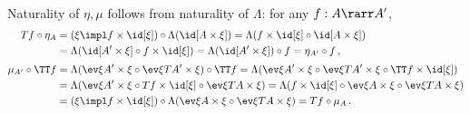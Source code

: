 \documentclass[12pt]{article}
\begin{document}
\begin{itemize}
\begin{align*}
    \end{align*}
    Naturality of $\eta,\mu$ follows from naturality of $\Lambda$: for any $f:A\rarr A'$,
    \begin{align*}
      Tf\circ\eta_A &= (\xi\impl f\times\id[\xi])\circ\Lambda(\id[A\times\xi]) = \Lambda(f\times\id[\xi]\circ\id[A\times\xi]) \\
        &= \Lambda(\id[A'\times\xi]\circ f\times\id[\xi]) = \Lambda(\id[A'\times\xi])\circ f = \eta_{A'}\circ f\,, \\[1mm]
      \mu_{A'}\circ\TT f &= \Lambda(\ev\xi{A'\times\xi}\circ\ev\xi{TA'\times\xi})\circ\TT f
        = \Lambda(\ev\xi{A'\times\xi}\circ\ev\xi{TA'\times\xi}\circ\TT f\times\id[\xi]) \\
        &= \Lambda(\ev\xi{A'\times\xi}\circ Tf\times\id[\xi]\circ\ev\xi{TA\times\xi})
        = \Lambda(f\times\id[\xi]\circ\ev\xi{A\times\xi}\circ\ev\xi{TA\times\xi}) \\
        &= (\xi\impl f\times\id[\xi])\circ\Lambda(\ev\xi{A\times\xi}\circ\ev\xi{TA\times\xi}) = Tf\circ\mu_A\,.
    \end{align*}

\end{itemize}
\end{document}
